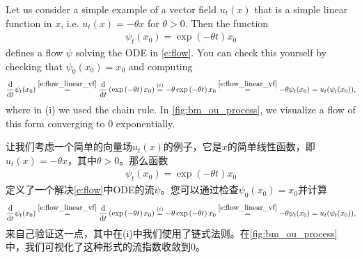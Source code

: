 \begin{examplebox}
Let us consider a simple example of a vector field $u_t(x)$ that is a simple linear function in $x$, i.e. $u_t(x)=-\theta x$ for $\theta>0$. Then the function
\begin{align}
    \label{e:flow_linear_vf}
    \psi_t(x_0) =  \exp\left(-\theta t\right)x_0
\end{align}
defines a flow $\psi$ solving the ODE in \cref{e:flow}. You can check this yourself by checking that $\psi_0(x_0)=x_0$ and computing
\begin{align*}
    \frac{\dd}{\dd t}\psi_t(x_0) \overset{\eqref{e:flow_linear_vf}}{=}\frac{\dd}{\dd t}\left(\exp\left(-\theta t\right)x_0\right)
    \overset{(i)}{=}-\theta\exp\left(-\theta t\right)x_0\overset{\eqref{e:flow_linear_vf}}{=}-\theta\psi_t(x_0)=u_t(\psi_t(x_0)),
\end{align*}
where in (i) we used the chain rule. In \cref{fig:bm_ou_process}, we visualize a flow of this form converging to $0$ exponentially.

让我们考虑一个简单的向量场$u_t(x)$的例子，它是$x$的简单线性函数，即$u_t(x)=-\theta x$，其中$\theta>0$。那么函数
\begin{align}
    \psi_t(x_0) =  \exp\left(-\theta t\right)x_0
\end{align}
定义了一个解决\cref{e:flow}中ODE的流$\psi$。您可以通过检查$\psi_0(x_0)=x_0$并计算
\begin{align*}
    \frac{\dd}{\dd t}\psi_t(x_0) \overset{\eqref{e:flow_linear_vf}}{=}\frac{\dd}{\dd t}\left(\exp\left(-\theta t\right)x_0\right)
    \overset{(i)}{=}-\theta\exp\left(-\theta t\right)x_0\overset{\eqref{e:flow_linear_vf}}{=}-\theta\psi_t(x_0)=u_t(\psi_t(x_0)),
\end{align*}
来自己验证这一点，其中在(i)中我们使用了链式法则。在\cref{fig:bm_ou_process}中，我们可视化了这种形式的流指数收敛到$0$。
\end{examplebox}

